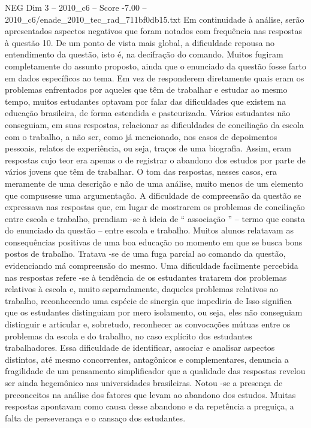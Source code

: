 \begin{textsample}{NEG Dim 3 – 2010\_c6 – Score -7.00 – 2010\_c6/enade\_2010\_tec\_rad\_711bf0db15.txt}
Em continuidade à análise, serão apresentados aspectos negativos que foram notados com frequência nas respostas à questão 10.
De um ponto de vista mais global, a dificuldade repousa no entendimento da questão, isto é, na decifração do comando.
Muitos fugiram completamente do assunto proposto, ainda que o enunciado da questão fosse farto em dados específicos ao tema.
Em vez de responderem diretamente quais eram os problemas enfrentados por aqueles que têm de trabalhar e estudar ao mesmo tempo, muitos estudantes optavam por falar das dificuldades que existem na educação brasileira, de forma estendida e pasteurizada.
Vários estudantes não conseguiam, em suas respostas, relacionar as dificuldades de conciliação da escola com o trabalho, a não ser, como já mencionado, nos casos de depoimentos pessoais, relatos de experiência, ou seja, traços de uma biografia.
Assim, eram respostas cujo teor era apenas o de registrar o abandono dos estudos por parte de vários jovens que têm de trabalhar.
O tom das respostas, nesses casos, era meramente de uma descrição e não de uma análise, muito menos de um elemento que compusesse uma argumentação.
A dificuldade de compreensão da questão se expressava nas respostas que, em lugar de mostrarem os problemas de conciliação entre escola e trabalho, prendiam -se à ideia de “ associação ” – termo que consta do enunciado da questão – entre escola e trabalho.
Muitos alunos relatavam as consequências positivas de uma boa educação no momento em que se busca bons postos de trabalho.
Tratava -se de uma fuga parcial ao comando da questão, evidenciando má compreensão do mesmo.
Uma dificuldade facilmente percebida nas respostas refere -se à tendência de os estudantes tratarem dos problemas relativos à escola e, muito separadamente, daqueles problemas relativos ao trabalho, reconhecendo uma espécie de sinergia que impediria de Isso significa que os estudantes distinguiam por mero isolamento, ou seja, eles não conseguiam distinguir e articular e, sobretudo, reconhecer as convocações mútuas entre os problemas da escola e do trabalho, no caso explícito dos estudantes trabalhadores.
Essa dificuldade de identificar, associar e analisar aspectos distintos, até mesmo concorrentes, antagônicos e complementares, denuncia a fragilidade de um pensamento simplificador que a qualidade das respostas revelou ser ainda hegemônico nas universidades brasileiras.
Notou -se a presença de preconceitos na análise dos fatores que levam ao abandono dos estudos.
Muitas respostas apontavam como causa desse abandono e da repetência a preguiça, a falta de perseverança e o cansaço dos estudantes.

\end{textsample}
